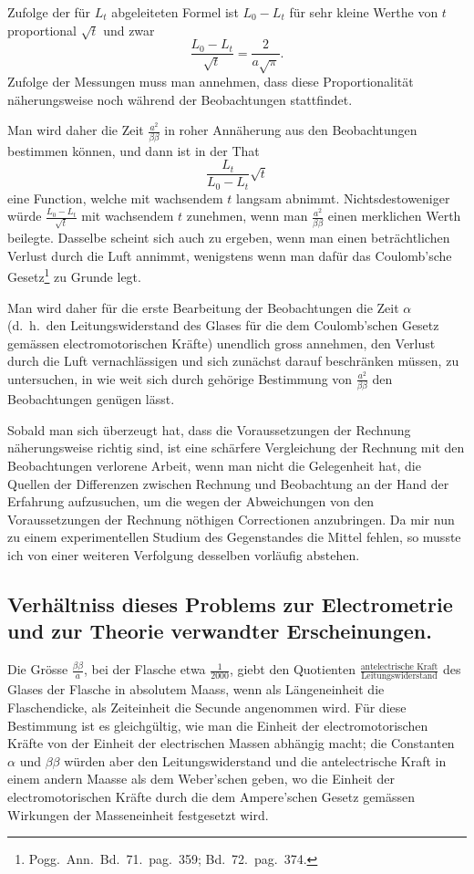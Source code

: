 \documentclass[12pt,a4paper]{article}
\begin{document}
Zufolge der f\"ur $L_t$ abgeleiteten Formel ist $L_0 - L_t$ f\"ur sehr kleine Werthe von $t$ proportional $\sqrt{t}$ und zwar
\[
\frac{L_0 - L_t}{\sqrt{t}} = \frac{2}{a\sqrt{\pi}}.
\]
Zufolge der Messungen muss man annehmen, dass diese Proportionalit\"at n\"aherungsweise noch w\"ahrend der Beobachtungen stattfindet.

Man wird daher die Zeit $\frac{a^2}{\beta\beta}$ in roher Ann\"aherung aus den Beobachtungen bestimmen k\"onnen, und dann ist in der That
\[
\frac{L_t}{L_0 - L_t}\sqrt{t}
\]
eine Function, welche mit wachsendem $t$ langsam abnimmt. Nichtsdestoweniger w\"urde $\frac{L_0 - L_t}{\sqrt{t}}$ mit wachsendem $t$ zunehmen, wenn man $\frac{a^2}{\beta\beta}$ einen merklichen Werth beilegte. Dasselbe scheint sich auch zu ergeben, wenn man einen betr\"achtlichen Verlust durch die Luft annimmt, wenigstens wenn man daf\"ur das Coulomb'sche Gesetz\footnote{Pogg.\ Ann.\ Bd.~71.\ pag.~359; Bd.~72.\ pag.~374.} zu Grunde legt.

Man wird daher f\"ur die erste Bearbeitung der Beobachtungen die Zeit $\alpha$ (d.\ h.\ den Leitungswiderstand des Glases f\"ur die dem Coulomb'schen Gesetz gem\"assen electromotorischen Kr\"afte) unendlich gross annehmen, den Verlust durch die Luft vernachl\"assigen und sich zun\"achst darauf beschr\"anken m\"ussen, zu untersuchen, in wie weit sich durch geh\"orige Bestimmung von $\frac{a^2}{\beta\beta}$ den Beobachtungen gen\"ugen l\"asst.

Sobald man sich \"uberzeugt hat, dass die Voraussetzungen der Rechnung n\"aherungsweise richtig sind, ist eine sch\"arfere Vergleichung der Rechnung mit den Beobachtungen verlorene Arbeit, wenn man nicht die Gelegenheit hat, die Quellen der Differenzen zwischen Rechnung und Beobachtung an der Hand der Erfahrung aufzusuchen, um die wegen der Abweichungen von den Voraussetzungen der Rechnung n\"othigen Correctionen anzubringen. Da mir nun zu einem experimentellen Studium des Gegenstandes die Mittel fehlen, so musste ich von einer weiteren Verfolgung desselben vorl\"aufig abstehen.

\subsection*{Verh\"altniss dieses Problems zur Electrometrie und zur Theorie verwandter Erscheinungen.}

Die Gr\"osse $\frac{\beta\beta}{a}$, bei der Flasche etwa $\frac{1}{2000}$, giebt den Quotienten $\frac{\text{antelectrische Kraft}}{\text{Leitungswiderstand}}$ des Glases der Flasche in absolutem Maass, wenn als L\"angeneinheit die Flaschendicke, als Zeiteinheit die Secunde angenommen wird. F\"ur diese Bestimmung ist es gleichg\"ultig, wie man die Einheit der electromotorischen Kr\"afte von der Einheit der electrischen Massen abh\"angig macht; die Constanten $\alpha$ und $\beta\beta$ w\"urden aber den Leitungswiderstand und die antelectrische Kraft in einem andern Maasse als dem Weber'schen geben, wo die Einheit der electromotorischen Kr\"afte durch die dem Ampere'schen Gesetz gem\"assen Wirkungen der Masseneinheit festgesetzt wird.
\end{document}
